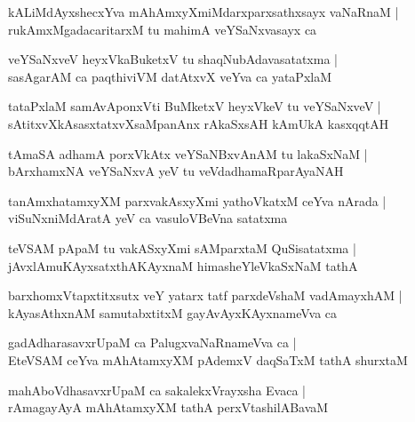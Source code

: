 \documentclass[twoside,12pt,openright]{book}
\newcounter{shloka}[chapter]
\begin{document}
\begin{shloka}%
kALiMdAyxshecxYva mAhAmxyXmiMdarxparxsathxsayx vaNaRnaM |\\
rukAmxMgadacaritarxM tu mahimA veYSaNxvasayx ca 
\end{shloka}

\begin{shloka}%
veYSaNxveV heyxVkaBuketxV tu shaqNubAdavasatatxma |\\
sasAgarAM ca paqthiviVM datAtxvX veYva ca yataPxlaM 
\end{shloka}

\begin{shloka}%
tataPxlaM samAvAponxVti BuMketxV heyxVkeV tu veYSaNxveV |\\
sAtitxvXkAsasxtatxvXsaMpanAnx rAkaSxsAH kAmUkA kasxqqtAH 
\end{shloka}

\begin{shloka}%
tAmaSA adhamA porxVkAtx veYSaNBxvAnAM tu lakaSxNaM |\\
bArxhamxNA veYSaNxvA yeV tu veVdadhamaRparAyaNAH 
\end{shloka}

\begin{shloka}%
tanAmxhatamxyXM parxvakAsxyXmi yathoVkatxM ceYva nArada |\\
viSuNxniMdAratA yeV ca vasuloVBeVna satatxma
\end{shloka}

\begin{shloka}%
teVSAM pApaM tu vakASxyXmi sAMparxtaM QuSisatatxma |\\
jAvxlAmuKAyxsatxthAKAyxnaM himasheYleVkaSxNaM tathA 
\end{shloka}

\begin{shloka}%
barxhomxVtapxtitxsutx veY yatarx tatf parxdeVshaM vadAmayxhAM |\\
kAyasAthxnAM samutabxtitxM gayAvAyxKAyxnameVva ca 
\end{shloka}

\begin{shloka}%
gadAdharasavxrUpaM ca PalugxvaNaRnameVva ca |\\
EteVSAM ceYva mAhAtamxyXM pAdemxV daqSaTxM tathA shurxtaM 
\end{shloka}

\begin{shloka}%
mahAboVdhasavxrUpaM ca sakalekxVrayxsha Evaca |\\
rAmagayAyA mAhAtamxyXM tathA perxVtashilABavaM 
\end{shloka}
\end{document}
